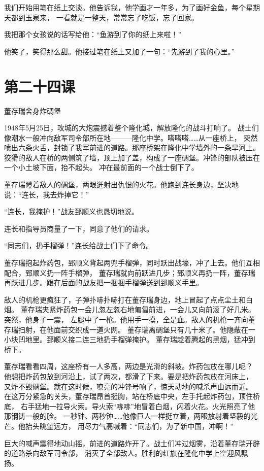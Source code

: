 \documentclass[12pt,UTF8]{ctexbook}
\begin{document}
我们开始用笔在纸上交谈。他告诉我，他学画才一年多，为了画好金鱼，每个星期天都到玉泉来，
一看就是一整天，常常忘了吃饭，忘了回家。

我把那个女孩说的话写给他：“鱼游到了你的纸上来啦！”

他笑了，笑得那么甜。他接过笔在纸上又加了一句：“先游到了我的心里。”

\section{第二十四课}

董存瑞舍身炸碉堡

1948年5月25日，攻城的大炮震撼着整个隆化城，解放隆化的战斗打响了。
战士们像潮水一般冲向敌军司令部所在地———隆化中学。嗒嗒嗒……从一座桥上，
突然喷出六条火舌，封锁了我军前进的道路。那座桥架在隆化中学墙外的一条旱河上。
狡猾的敌人在桥的两侧筑了墙，顶上加了盖，构成了一座碉堡。冲锋的部队被压在一个小土坡下面，抬不起头。
冲在最前面的一个战士倒下了。

董存瑞瞪着敌人的碉堡，两眼迸射出仇恨的火花。他跑到连长身边，坚决地说：“连长，我去炸掉它！”

“连长，我掩护！”战友郅顺义也恳切地说。

连长和指导员商量了一下，同意了他们的请求。

“同志们，扔手榴弹！”连长给战士们下了命令。

董存瑞抱起炸药包，郅顺义背起两兜手榴弹，同时跃出战壕，冲了上去。他们互相配合，郅顺义扔一阵手榴弹，
董存瑞就向前跃进几步；郅顺义再扔一阵，董存瑞再跃进几步。跟在后面的战友把一捆捆手榴弹送到郅顺义手里。

敌人的机枪更疯狂了，子弹扑哧扑哧打在董存瑞身边，地上冒起了点点尘土和白烟。
董存瑞夹紧炸药包一会儿忽左忽右地匍匐前进，一会儿又向前滚了好几米。突然，他身子一震，
左腿中了一枪。他用手一摸，全是血。敌人的机枪一齐向董存瑞扫射，在他面前交织成一道火网。
董存瑞离碉堡只有几十米了。他隐蔽在一小块凹地里。郅顺义接二连三地扔手榴弹掩护。
董存瑞趁着腾起的黑烟，猛冲到桥下。

董存瑞看看四周，这座桥有一人多高，两边是光滑的斜坡。炸药包放在哪儿呢？
他想把炸药包放到河沿上，试了两次，都滑了下来。要是把炸药包放在河床上，
又炸不毁碉堡。就在这时候，嘹亮的冲锋号响了，惊天动地的喊杀声由远而近。
在这万分紧急的关头，董存瑞昂首挺胸，站在桥底中央，左手托起炸药包，顶住桥底，
右手猛地一拉导火索。导火索“哧哧”地冒着白烟，闪着火花。火光照亮了他那钢铸一般的脸。
一秒钟、两秒钟……他像巨人一样挺立着，两眼放射着坚毅的光芒。他抬头眺望远方，
用尽力气高喊着：“同志们，为了新中国，冲啊！”

巨大的喊声震得地动山摇，前进的道路炸开了。战士们冲过烟雾，沿着董存瑞开辟的道路杀向敌军司令部，
消灭了全部敌人。胜利的红旗在隆化中学上空迎风飘扬。
\end{document}
